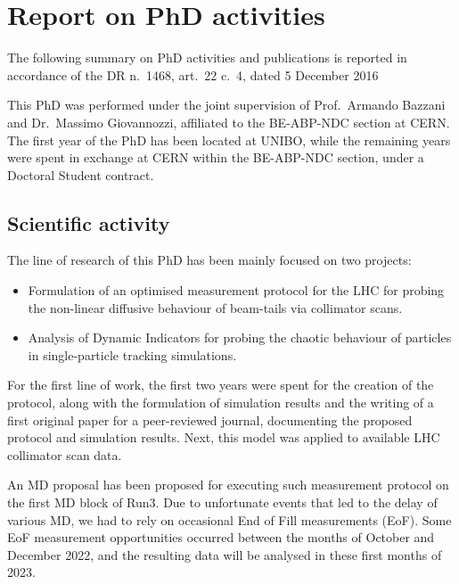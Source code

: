 \chapter*{Report on PhD activities}
\sectionmark{}

\noindent\textsf{The following summary on PhD activities and publications is reported in accordance of the DR n.~1468, art.~22 c.~4, dated 5 December 2016}

\vspace{3em}

This PhD was performed under the joint supervision of Prof.~Armando Bazzani and Dr.~Massimo Giovannozzi, affiliated to the BE-ABP-NDC section at CERN. The first year of the PhD has been located at UNIBO, while the remaining years were spent in exchange at CERN within the BE-ABP-NDC section, under a Doctoral Student contract.

\section*{Scientific activity}

The line of research of this PhD has been mainly focused on two projects:
\begin{itemize}
    \item Formulation of an optimised measurement protocol for the LHC for
probing the non-linear diffusive behaviour of beam-tails via collimator
scans.
    \item Analysis of Dynamic Indicators for probing the chaotic behaviour of particles
in single-particle tracking simulations.
\end{itemize}

For the first line of work, the first two years were spent for the creation of the protocol, along with the formulation of simulation results and the writing of a first original paper for a peer-reviewed journal, documenting the proposed protocol and simulation results. Next, this
model was applied to available LHC collimator scan data.

An MD proposal has been proposed for executing such measurement
protocol on the first MD block of Run3. Due to unfortunate events that led to
the delay of various MD, we had to rely on occasional End of Fill
measurements (EoF). Some EoF measurement opportunities occurred between the months of October and December 2022, and the resulting data will be analysed in these first months of 2023.

